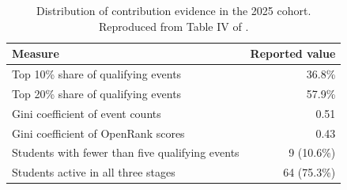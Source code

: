 \begin{table}[htbp]
\caption{Distribution of contribution evidence in the 2025 cohort. Reproduced from Table IV of \citet{seetmanuscript}.}
\label{tab:ch7-concentration}
\small\renewcommand{\arraystretch}{1.15}
\begin{tabularx}{\linewidth}{@{}>{\raggedright\arraybackslash}Xr@{}}\toprule
Measure & Reported value\\\midrule
Top 10\% share of qualifying events & 36.8\%\\
Top 20\% share of qualifying events & 57.9\%\\
Gini coefficient of event counts & 0.51\\
Gini coefficient of OpenRank scores & 0.43\\
Students with fewer than five qualifying events & 9 (10.6\%)\\
Students active in all three stages & 64 (75.3\%)\\\bottomrule
\end{tabularx}
\end{table}
